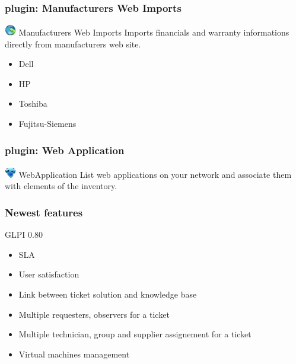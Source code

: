 \documentclass{beamer}
\begin{document}
\begin{frame}
    \frametitle{plugin: Manufacturers Web Imports}
    
    \begin{block}{\includegraphics[height=0.5cm]{./pics/plugins/manufacturer.jpg} Manufacturers Web Imports}
        Imports financials and warranty informations directly from manufacturers web site.
        \begin{itemize}
            \item Dell 
            \item HP
            \item Toshiba
            \item Fujitsu-Siemens 
        \end{itemize}
    \end{block}

\end{frame}

\begin{frame}
    \frametitle{plugin: Web Application}
    
    \begin{block}{\includegraphics[height=0.5cm]{./pics/plugins/webapp.jpg} WebApplication}
        List web applications on your network and associate them with elements of the inventory.
    \end{block}

\end{frame}


\begin{frame}

    \frametitle{Newest features}

    \begin{block}{GLPI 0.80}
        \begin{itemize}
            \item SLA
            \item User satisfaction 
            \item Link between ticket solution and knowledge base 
            \item Multiple requesters, observers for a ticket
            \item Multiple technician, group and supplier assignement for a ticket
            \item Virtual machines management 
        \end{itemize}
    \end{block}

\end{frame}
\end{document}
